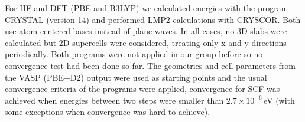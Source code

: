 \documentclass[11pt,DIV=13,BCOR=5mm,a4paper,headinclude]{scrbook}
\begin{document}
For HF and DFT (PBE and B3LYP) we calculated energies with the program CRYSTAL\cite{crystal14} (version 14) and performed LMP2 calculations with CRYSCOR\cite{cryscor}.
Both use atom centered bases instead of plane waves.
In all cases, no 3D slabs were calculated but 2D supercells were considered, treating only x and y directions periodically.
Both programs were not applied in our group before so no convergence test had been done so far.
The geometries and cell parameters from the VASP (PBE+D2) output were used as starting points and the usual convergence criteria of the programs were applied, convergence for SCF was achieved when energies between two steps were smaller than $2.7\times 10^{-6}\,$eV (with some exceptions when convergence was hard to achieve).
\\\\

\end{document}
